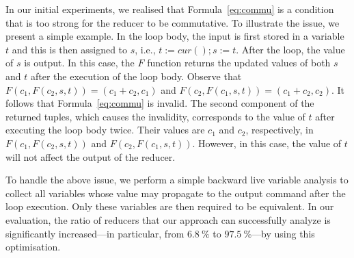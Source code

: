 \documentclass{llncs}
\newcommand{\cur}{cur()}
\begin{document}
In our initial experiments, we realised that Formula~\ref{eq:commu} is a
condition that is too strong for the reducer to be commutative. To illustrate
the issue, we present a simple example. In the loop body, the input is first
stored in a variable $t$ and this is then assigned to $s$, i.e., $t:=\cur;s:=t$.
After the loop, the value of $s$ is output. In this case, the $F$ function
returns the updated values of both $s$ and $t$ after the execution of the loop
body. Observe that $F(c_1, F(c_2,s,t)) = (c_1+c_2, c_1)$ and $F(c_2, F(c_1,s,t))
= (c_1+c_2, c_2)$. It follows that Formula~\ref{eq:commu} is invalid. The second
component of the returned tuples, which causes the invalidity, corresponds to
the value of $t$ after executing the loop body twice. Their values are $c_1$ and
$c_2$, respectively, in $F(c_1, F(c_2,s,t))$ and $F(c_2, F(c_1,s,t))$. However,
in this case, the value of $t$ will not affect the output of the reducer.

To handle the above issue, we perform a simple backward live variable analysis
to collect all variables whose value may propagate to the output command after
the loop execution. Only these variables are then required to be equivalent. In
our evaluation, the ratio of reducers that our approach can successfully analyze
is significantly increased---in particular, from $6.8~\%$ to $97.5~\%$---by
using this optimisation. 
\end{document}

